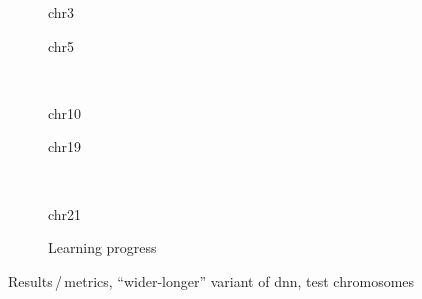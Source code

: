 \begin{figure}[p]%
    \begin{subfigure}{0.45\textwidth}
        \scriptsize
        \caption{chr3}
    \end{subfigure} \hfill
    \begin{subfigure}{0.45\textwidth}
        \scriptsize
        \caption{chr5}
    \end{subfigure}\\[5mm]
    \begin{subfigure}{0.45\textwidth}
        \scriptsize
        \caption{chr10}
    \end{subfigure}\hfill
    \begin{subfigure}{0.45\textwidth}
        \scriptsize
        \caption{chr19}
    \end{subfigure}\\[3mm]
    \centering
    \begin{subfigure}{0.45\textwidth}
        \scriptsize
        \caption{chr21}
    \end{subfigure}\hfill
    \begin{subfigure}{0.45\textwidth}
        \caption{Learning progress} \label{fig:results:wider-longerDNN_lossEpochs}
    \end{subfigure}
    \caption{Results\,/\,metrics, ``wider-longer'' variant of \acrshort{dnn},  test chromosomes}
    \label{fig:results:wider-longerDNN_pearson}
\end{figure}
